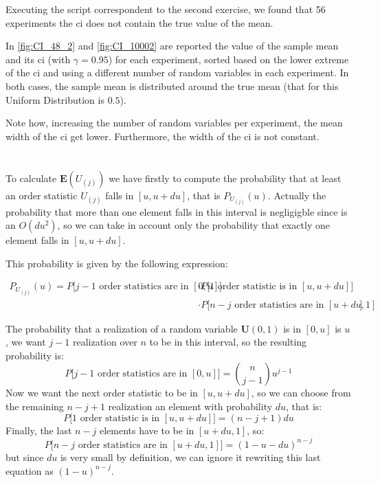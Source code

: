 \documentclass[11pt,a4paper]{article}
\begin{document}
Executing the script correspondent to the second exercise, we found that 56 experiments the \gls{ci} does not contain the true value of the mean.

In \autoref{fig:CI_48_2} and \autoref{fig:CI_10002} are reported the value of the sample mean and its \gls{ci} (with $\gamma=0.95$) for each experiment, sorted based on the lower extreme of the \gls{ci} and using a different number of random variables in each experiment.
In both cases, the sample mean is distributed around the true mean (that for this Uniform Distribution is $0.5$).

Note how, increasing the number of random variables per experiment, the mean width of the \gls{ci} get lower. Furthermore, the width of the \gls{ci} is not constant.

\section{}

To calculate $\mathbf{E}(U_{(j)})$ we have firstly to compute the probability that at least an order statistic $U_{(j)}$ falls in $[u, u+du]$, that is $P_{U_{(j)}}(u)$. Actually the probability that more than one element falls in this interval is negligigble since is an $O(du^2)$, so we can take in account only the probability that exactly one element falls in $[u, u+du]$.

This probability is given by the following expression:

\begin{equation}\label{eq:p(u)}
  \begin{split}
    P_{U_{(j)}}(u) = P\bigg[\text{$j-1$ order statistics are in $[0, u]$}\bigg] &\cdot P\bigg[\text{1 order statistic is in $[u, u+du]$}\bigg] \\&\cdot P\bigg[\text{$n-j$ order statistics are in $[u+du, 1]$}\bigg]
  \end{split}
\end{equation}

The probability that a realization of a random variable $\mathbf{U}(0,1)$ is in $[0, u]$ is $u$, we want $j-1$ realization over $n$ to be in this interval, so the resulting probability is:
$$
P\bigg[\text{$j-1$ order statistics are in $[0, u]$}\bigg] = \binom{n}{j-1}u^{j-1}
$$
Now we want the next order statistic to be in $[u, u+du]$, so we can choose from the remaining $n-j+1$ realization an element with probability $du$, that is:
$$ P\bigg[\text{1 order statistic is in $[u, u+du]$}\bigg] = (n-j+1)du$$
Finally, the last $n-j$ elements have to be in $[u+du,1]$, so:
$$ P\bigg[\text{$n-j$ order statistics are in $[u+du, 1]$}\bigg] = (1-u-du)^{n-j} $$
but since $du$ is very small by definition, we can ignore it rewriting this last equation as $(1-u)^{n-j}$.
\end{document}
